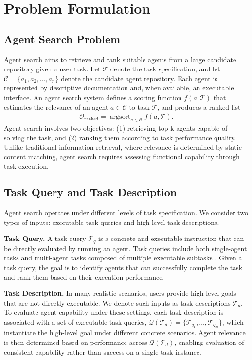 \documentclass{article} %
\begin{document}
\section{Problem Formulation}

\subsection{Agent Search Problem}

Agent search aims to retrieve and rank suitable agents from a large candidate repository given a user task. Let $\mathcal{T}$ denote the task specification, and let $\mathcal{C} = \{a_1, a_2, \dots, a_n\}$ denote the candidate agent repository. Each agent is represented by descriptive documentation and, when available, an executable interface. An agent search system defines a scoring function $f(a,\mathcal{T})$ that estimates the relevance of an agent $a \in \mathcal{C}$ to task $\mathcal{T}$, and produces a ranked list
\begin{align}
\mathcal{O}_{\mathrm{ranked}} = \operatorname{argsort}_{a \in \mathcal{C}} f(a,\mathcal{T}).
\end{align}
Agent search involves two objectives: (1) retrieving top-k agents capable of solving the task, and (2) ranking them according to task performance quality. Unlike traditional information retrieval, where relevance is determined by static content matching, agent search requires assessing functional capability through task execution.

\subsection{Task Query and Task Description}

Agent search operates under different levels of task specification. We consider two types of inputs: executable task queries and high-level task descriptions.

\textbf{Task Query. }
A task query $\mathcal{T}_q$ is a concrete and executable instruction that can be directly evaluated by running an agent. Task queries include both single-agent tasks and multi-agent tasks composed of multiple executable subtasks \citep{DBLP:conf/iclr/QinLYZYLLCTQZHT24, shi2025retrieval}. Given a task query, the goal is to identify agents that can successfully complete the task and rank them based on their execution performance.

\textbf{Task Description. }
In many realistic scenarios, users provide high-level goals that are not directly executable. We denote such inputs as task descriptions $\mathcal{T}_d$. To evaluate agent capability under these settings, each task description is associated with a set of executable task queries, $\mathcal{Q}(\mathcal{T}_d) = \{\mathcal{T}_{q_1}, \dots, \mathcal{T}_{q_m}\}$,
which instantiate the high-level goal under different concrete scenarios. Agent relevance is then determined based on performance across $\mathcal{Q}(\mathcal{T}_d)$, enabling evaluation of consistent capability rather than success on a single task instance.
\end{document}
